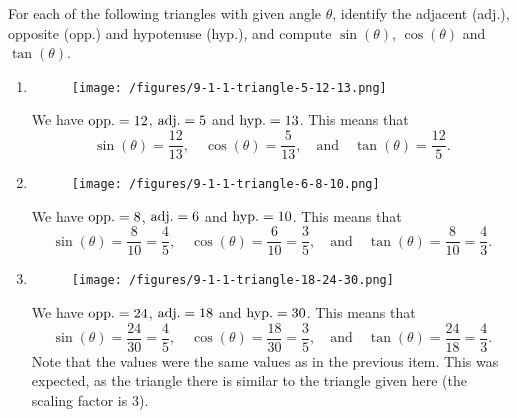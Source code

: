 \documentclass{ximera}
\begin{document}
\begin{example}
  For each of the following triangles with given angle $\theta$, identify the adjacent (adj.), opposite (opp.) and hypotenuse (hyp.), and compute $\sin(\theta)$, $\cos(\theta)$ and $\tan(\theta)$.

  \begin{enumerate}[label=\alph*.]
  \item  \begin{figure}[h]
  \centering
  \texttt{[image: /figures/9-1-1-triangle-5-12-13.png]}
\end{figure}


    \begin{explanation}
      We have ${\rm opp.} = 12$, ${\rm adj.} = 5$ and ${\rm hyp.} = 13$. This means that $$\sin(\theta) = \frac{12}{13}, \quad \cos(\theta) = \frac{5}{13},\quad \mbox{and}\quad \tan(\theta) = \frac{12}{5}.$$
    \end{explanation}
    
  \item \begin{figure}[h]
  \centering
  \texttt{[image: /figures/9-1-1-triangle-6-8-10.png]}
\end{figure}

    \begin{explanation}
      We have ${\rm opp.} = 8$, ${\rm adj.} = 6$ and ${\rm hyp.} = 10$. This means that $$\sin(\theta) = \frac{8}{10}=\frac{4}{5}, \quad \cos(\theta) = \frac{6}{10}=\frac{3}{5},\quad \mbox{and}\quad \tan(\theta) = \frac{8}{10}=\frac{4}{3}.$$
    \end{explanation}
    
  \item \begin{figure}[h]
  \centering
  \texttt{[image: /figures/9-1-1-triangle-18-24-30.png]}
\end{figure}


        \begin{explanation}
          We have ${\rm opp.} = 24$, ${\rm adj.} = 18$ and ${\rm hyp.} = 30$. This means that $$\sin(\theta) = \frac{24}{30}=\frac{4}{5}, \quad \cos(\theta) = \frac{18}{30}=\frac{3}{5},\quad \mbox{and}\quad \tan(\theta) = \frac{24}{18}=\frac{4}{3}.$$ Note that the values were the same values as in the previous item. This was expected, as the triangle there is similar to the triangle given here (the scaling factor is $3$).\end{explanation}    
  \end{enumerate}
\end{example}
\end{document}
